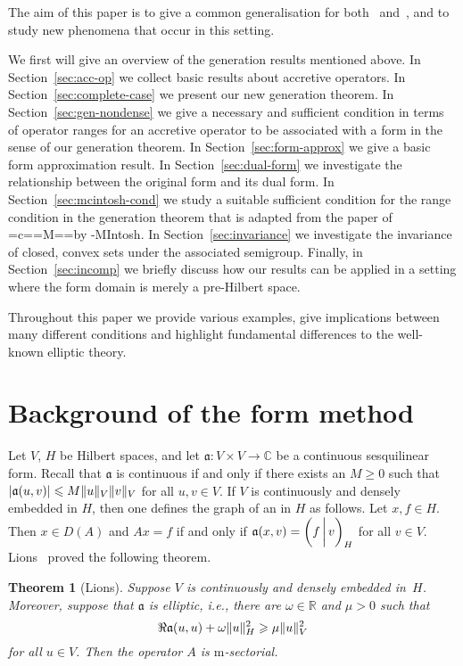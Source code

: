 \documentclass[a4paper,oneside,12pt]{amsart}
\theoremstyle{plain}
\newtheorem{theorem}{Theorem}[section]
\theoremstyle{definition}
\let\le=\leqslant
\let\ge=\geqslant
\DeclarePairedDelimiter\norm{\lVert}{\rVert}
\DeclarePairedDelimiter\abs{\lvert}{\rvert}
\DeclareRobustCommand{\Mc}{\setbox0=\hbox{c}\mycheight=\ht0\setbox0=\hbox{M}\myMheight=\ht0\mycshift=\myMheight\advance\mycshift by -\mycheight\mbox{M\raisebox{\mycshift}{c}I}}
\DeclareRobustCommand{\McIntosh}{{\Mc}ntosh\xspace}
\begin{document}
The aim of this paper is to give a common generalisation for
both~\cite{McIntosh1968:repres} and~\cite{AtE12:sect-form},
and to study new phenomena that occur in this setting.

We first will give an overview of the generation results mentioned above.
In Section~\ref{sec:acc-op} we collect basic results about accretive operators. 
In Section~\ref{sec:complete-case} we present our new generation theorem.
In Section~\ref{sec:gen-nondense} we give a necessary and sufficient condition in terms of operator ranges for an accretive operator to be associated with a form in the sense of our generation theorem.
In Section~\ref{sec:form-approx} we give a basic form approximation result. 
In Section~\ref{sec:dual-form} we investigate the relationship between the original form and its dual form.
In Section~\ref{sec:mcintosh-cond} we study a suitable sufficient condition for the range condition in the
generation theorem that is adapted from the paper of \McIntosh.
In Section~\ref{sec:invariance} we investigate the invariance of closed, convex sets under the associated semigroup.
Finally, in Section~\ref{sec:incomp} we briefly discuss how our results can be applied in a setting where the form domain is merely a pre-Hilbert space.

Throughout this paper we provide various examples, give implications between many different conditions and highlight fundamental differences to the well-known elliptic theory.

\section{Background of the form method}

Let $V$, $H$ be Hilbert spaces, and let ${{\mathfrak{{a}}}}\colon V\times V\to{\mathbb{C}}$ be a continuous sesquilinear form.
Recall that ${{\mathfrak{{a}}}}$ is continuous if and only if there exists an $M\ge 0$
such that $\abs{{{\mathfrak{{a}}}}(u,v)}\le M\norm{u}_V\norm{v}_V$ for all $u,v\in V$.
If $V$ is continuously and densely embedded in $H$, then one defines the graph of an {\textbf{\unboldmath}} in $H$ as follows. 
Let $x,f\in H$. Then $x\in D(A)$ and $Ax=f$ if and only if ${{\mathfrak{{a}}}}(x,v)={{\ifthenelse{\equal{auto}{auto}}{\left({f}\mkern3mu{\biggm|}\mkern3mu {v}\right)}{}
\ifthenelse{\equal{auto}{b}}{\bigl({f}\mkern3mu{\biggm|}\mkern3mu {v}\bigr)}{}
\ifthenelse{\equal{auto}{B}}{\Bigl({f}\mkern3mu{\bigm|}\mkern3mu {v}\Bigr)}{}
}}_H$ for all $v\in V$.
Lions~\cite[Theorem~3.6]{Lions57} proved the following theorem.
\begin{theorem}[Lions]\label{thm:lions} 
Suppose $V$ is continuously and densely embedded in~$H$.
Moreover, suppose that ${{\mathfrak{{a}}}}$ is elliptic, i.e., there are $\omega\in{\mathbb{R}}$ and $\mu>0$ such that
\[
    \Re {{\mathfrak{{a}}}}(u,u) + \omega\norm{u}_H^2\ge \mu\norm{u}_V^2
\]
for all $u\in V$. Then the operator $A$ is {\ensuremath{\text{m}}}-sectorial.
\end{theorem}
\end{document}
